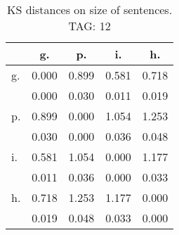 \begin{table}[h!]
\begin{center}
\begin{tabular}{| l | c | c | c | c |}\hline
 & g. & p. & i. & h. \\\hline
g. & 0.000  & 0.899  & 0.581  & 0.718 \\\hline
 & 0.000  & 0.030  & 0.011  & 0.019 \\\hline
p. & 0.899  & 0.000  & 1.054  & 1.253 \\\hline
 & 0.030  & 0.000  & 0.036  & 0.048 \\\hline
i. & 0.581  & 1.054  & 0.000  & 1.177 \\\hline
 & 0.011  & 0.036  & 0.000  & 0.033 \\\hline
h. & 0.718  & 1.253  & 1.177  & 0.000 \\\hline
 & 0.019  & 0.048  & 0.033  & 0.000 \\\hline
\end{tabular}
\caption{KS distances on size of sentences. TAG: 12}
\end{center}
\end{table}